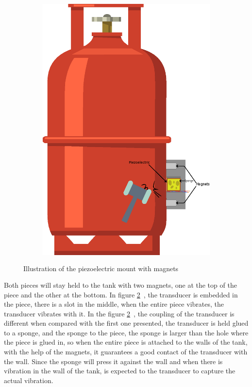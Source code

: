 \begin{figure}[]
\begin{subfigure}{0.3\textwidth}
        \includegraphics[width=\linewidth]{Chapters/4CHP/Figures/PiezoMagnets.eps}
        \caption{}{}
        \label{subfig:piezosponge}
    \end{subfigure}
    \caption{Illustration of the piezoelectric mount with magnets}{}
    \label{fig:coupPiezo}
\end{figure}
Both pieces will stay held to the tank with two magnets, one at the top of the piece and the other at the bottom. In figure \ref{fig:coupPiezo}~, the transducer is embedded in the piece, there is a slot in the middle, when the entire piece vibrates, the transducer vibrates with it. In the figure \ref{fig:coupPiezo}~, the coupling of the transducer is different when compared with the first one presented, the transducer is held glued to a sponge, and the sponge to the piece, the sponge is larger than the hole where the piece is glued in, so when the entire piece is attached to the walls of the tank, with the help of the magnets, it guarantees a good contact of the transducer with the wall. Since the sponge will press it against the wall and when there is vibration in the wall of the tank, is expected to the transducer to capture the actual vibration. 
